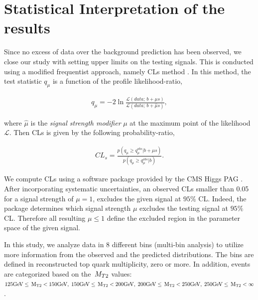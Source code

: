 
\section[Statistics]{Statistical Interpretation of the results}\label{sect:stat}

Since no excess of data over the background prediction has been observed, 
we close our study with setting upper limits on the testing signals.
This is conducted using a modified frequentist approach, namely CLs method \cite{read:CLs}.
In this method, the test statistic $q_\mu$ \cite{cowan:asymptoticCLs} is a function of the profile likelihood-ratio,

\begin{align}
q_\mu = -2 \ln \frac{\mathcal{L}(data ;\, b + \mu s)}{\mathcal{L}(data ;\, b + \hat{\mu} s)},
\end{align}

where $\hat\mu$ is the \textit{signal strength modifier} $\mu$ at the maximum point of the likelihood $\mathcal{L}$.
Then CLs is given by the following probability-ratio,

\begin{align}
CL_s = \frac{p(q_\mu \geq q_\mu^{obs} | b + \mu s )}{p(q_\mu \geq q_\mu^{obs} | b)}.
\end{align}
 
We compute CLs using a software package provided by the CMS Higgs PAG \cite{higgspag:software}.
After incorporating systematic uncertainties, an observed CLs smaller than 0.05 for a signal strength of $\mu = 1$, excludes the given signal at $95\%$ CL. Indeed, the package determines which signal strength $\mu$ excludes the testing signal at $95\%$ CL. Therefore all resulting $\mu \leq 1$ define the excluded region in the parameter space of the given signal. 

In this study, we analyze data in 8 different bins (multi-bin analysis) to utilize more information from 
the observed and the predicted distributions.
The bins are defined in reconstructed top quark multiplicity, zero or more. In addition, events are categorized based on the $\,{M_{T2}}$ values: $125\rm{GeV} \leq \,{M_{T2}} < 150\rm{GeV},\; 150\rm{GeV} \leq \,{M_{T2}} < 200\rm{GeV},\; 200\rm{GeV} \leq \,{M_{T2}} < 250\rm{GeV},\; 250\rm{GeV} \leq \,{M_{T2}} < \infty$.

